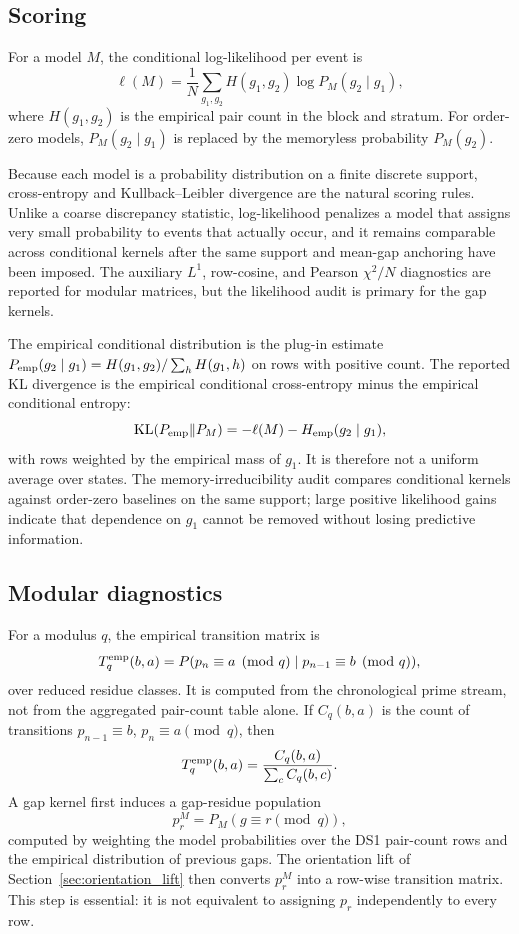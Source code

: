 \documentclass[10pt]{article}
\begin{document}
\subsection{Scoring}
For a model $M$, the conditional log-likelihood per event is
\[
\ell(M)=\frac{1}{N}\sum_{g_1,g_2}H(g_1,g_2)\log P_M(g_2\mid g_1),
\]
where $H(g_1,g_2)$ is the empirical pair count in the block and stratum.  For order-zero models, $P_M(g_2\mid g_1)$ is replaced by the memoryless probability $P_M(g_2)$.

Because each model is a probability distribution on a finite discrete support, cross-entropy and Kullback--Leibler divergence are the natural scoring rules.  Unlike a coarse discrepancy statistic, log-likelihood penalizes a model that assigns very small probability to events that actually occur, and it remains comparable across conditional kernels after the same support and mean-gap anchoring have been imposed.  The auxiliary $L^1$, row-cosine, and Pearson $\chi^2/N$ diagnostics are reported for modular matrices, but the likelihood audit is primary for the gap kernels.

The empirical conditional distribution is the plug-in estimate $P_{\rm emp}(g_2\mid g_1)=H(g_1,g_2)/\sum_h H(g_1,h)$ on rows with positive count.  The reported KL divergence is the empirical conditional cross-entropy minus the empirical conditional entropy:
\[
\mathrm{KL}(P_{\rm emp}\Vert P_M)
= -\ell(M)-H_{\rm emp}(g_2\mid g_1),
\]
with rows weighted by the empirical mass of $g_1$.  It is therefore not a uniform average over states.  The memory-irreducibility audit compares conditional kernels against order-zero baselines on the same support; large positive likelihood gains indicate that dependence on $g_1$ cannot be removed without losing predictive information.

\subsection{Modular diagnostics}
For a modulus $q$, the empirical transition matrix is
\[
T_q^{\rm emp}(b,a)=P(p_n\equiv a\pmod q\mid p_{n-1}\equiv b\pmod q),
\]
over reduced residue classes.  It is computed from the chronological prime stream, not from the aggregated pair-count table alone.  If $C_q(b,a)$ is the count of transitions $p_{n-1}\equiv b$, $p_n\equiv a\pmod q$, then
\[
T_q^{\rm emp}(b,a)=\frac{C_q(b,a)}{\sum_c C_q(b,c)}.
\]
A gap kernel first induces a gap-residue population
\[
p_r^M=P_M(g\equiv r\pmod q),
\]
computed by weighting the model probabilities over the DS1 pair-count rows and the empirical distribution of previous gaps.  The orientation lift of Section~\ref{sec:orientation_lift} then converts $p_r^M$ into a row-wise transition matrix.  This step is essential: it is not equivalent to assigning $p_r$ independently to every row.
\end{document}
